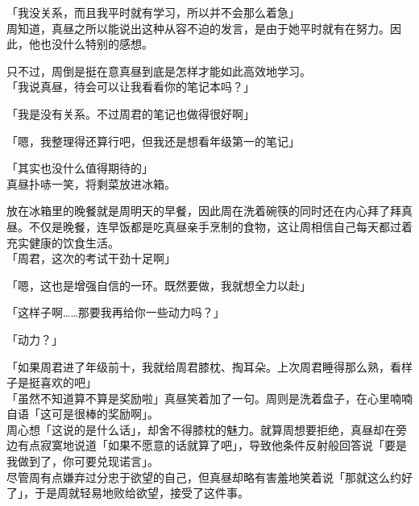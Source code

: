 「我没关系，而且我平时就有学习，所以并不会那么着急」\\

周知道，真昼之所以能说出这种从容不迫的发言，是由于她平时就有在努力。因此，他也没什么特别的感想。

只不过，周倒是挺在意真昼到底是怎样才能如此高效地学习。\\

「我说真昼，待会可以让我看看你的笔记本吗？」

「我是没有关系。不过周君的笔记也做得很好啊」

「嗯，我整理得还算行吧，但我还是想看年级第一的笔记」

「其实也没什么值得期待的」\\

真昼扑哧一笑，将剩菜放进冰箱。

放在冰箱里的晚餐就是周明天的早餐，因此周在洗着碗筷的同时还在内心拜了拜真昼。不仅是晚餐，连早饭都是吃真昼亲手烹制的食物，这让周相信自己每天都过着充实健康的饮食生活。\\

「周君，这次的考试干劲十足啊」

「嗯，这也是增强自信的一环。既然要做，我就想全力以赴」

「这样子啊……那要我再给你一些动力吗？」

「动力？」

「如果周君进了年级前十，我就给周君膝枕、掏耳朵。上次周君睡得那么熟，看样子是挺喜欢的吧」\\

「虽然不知道算不算是奖励啦」真昼笑着加了一句。周则是洗着盘子，在心里喃喃自语「这可是很棒的奖励啊」。\\

周心想「这说的是什么话」，却舍不得膝枕的魅力。就算周想要拒绝，真昼却在旁边有点寂寞地说道「如果不愿意的话就算了吧」，导致他条件反射般回答说「要是我做到了，你可要兑现诺言」。\\

尽管周有点嫌弃过分忠于欲望的自己，但真昼却略有害羞地笑着说「那就这么约好了」，于是周就轻易地败给欲望，接受了这件事。
